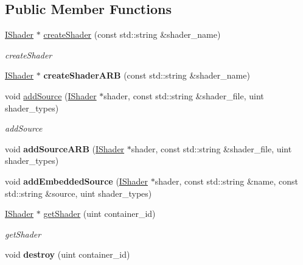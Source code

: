 \subsection*{Public Member Functions}
\begin{DoxyCompactItemize}
\item 
\hyperlink{classEngine_1_1IShader}{I\+Shader} $\ast$ \hyperlink{classEngine_1_1ShaderManager_a04436b2e5d1450b5d4828f121ad62b59}{create\+Shader} (const std\+::string \&shader\+\_\+name)
\begin{DoxyCompactList}\small\item\em create\+Shader \end{DoxyCompactList}\item 
\hypertarget{classEngine_1_1ShaderManager_aff321723a3ee2895d14efa5f9a1fb970}{}\hyperlink{classEngine_1_1IShader}{I\+Shader} $\ast$ {\bfseries create\+Shader\+A\+R\+B} (const std\+::string \&shader\+\_\+name)\label{classEngine_1_1ShaderManager_aff321723a3ee2895d14efa5f9a1fb970}

\item 
void \hyperlink{classEngine_1_1ShaderManager_a840d6840451cb9b191a4f0c0ad84854f}{add\+Source} (\hyperlink{classEngine_1_1IShader}{I\+Shader} $\ast$shader, const std\+::string \&shader\+\_\+file, uint shader\+\_\+types)
\begin{DoxyCompactList}\small\item\em add\+Source \end{DoxyCompactList}\item 
\hypertarget{classEngine_1_1ShaderManager_aef42d44027ae53273a6fcae937793630}{}void {\bfseries add\+Source\+A\+R\+B} (\hyperlink{classEngine_1_1IShader}{I\+Shader} $\ast$shader, const std\+::string \&shader\+\_\+file, uint shader\+\_\+types)\label{classEngine_1_1ShaderManager_aef42d44027ae53273a6fcae937793630}

\item 
\hypertarget{classEngine_1_1ShaderManager_a37df04871c43bca6c2899d0e6ae9b509}{}void {\bfseries add\+Embedded\+Source} (\hyperlink{classEngine_1_1IShader}{I\+Shader} $\ast$shader, const std\+::string \&name, const std\+::string \&source, uint shader\+\_\+types)\label{classEngine_1_1ShaderManager_a37df04871c43bca6c2899d0e6ae9b509}

\item 
\hyperlink{classEngine_1_1IShader}{I\+Shader} $\ast$ \hyperlink{classEngine_1_1ShaderManager_a5248b6515e8a50eb89375985289baf64}{get\+Shader} (uint container\+\_\+id)
\begin{DoxyCompactList}\small\item\em get\+Shader \end{DoxyCompactList}\item 
\hypertarget{classEngine_1_1ShaderManager_a64641685923c88f3356da1cd1e8f9d20}{}void {\bfseries destroy} (uint container\+\_\+id)\label{classEngine_1_1ShaderManager_a64641685923c88f3356da1cd1e8f9d20}


\end{DoxyCompactItemize}
